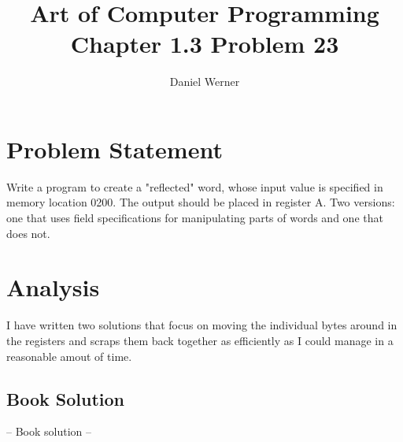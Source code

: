 \documentclass{article}
\title{Art of Computer Programming Chapter 1.3 Problem 23}
\author{Daniel Werner}
\begin{document}
\maketitle

\section*{
    Problem Statement
}

Write a program to create a "reflected" word, whose input value is specified in memory location 0200.
The output should be placed in register A.  Two versions: one that uses field specifications for manipulating
parts of words and one that does not.

\section*{
    Analysis
}

I have written two solutions that focus on moving the individual bytes around in the registers and scraps 
them back together as efficiently as I could manage in a reasonable amout of time.

\subsection* {
  Book Solution
}

-- Book solution --  
\end{document}
